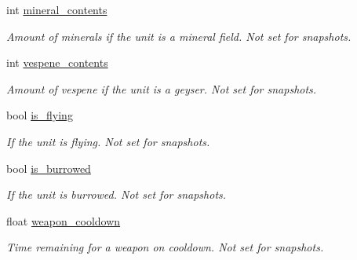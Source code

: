 \begin{DoxyCompactItemize}
\mbox{\label{classsc2_1_1_unit_a689d7b7c9a68b3cd172f2333203423b9}} 
int \hyperlink{classsc2_1_1_unit_a689d7b7c9a68b3cd172f2333203423b9}{mineral\+\_\+contents}
\begin{DoxyCompactList}\small\item\em Amount of minerals if the unit is a mineral field. Not set for snapshots. \end{DoxyCompactList}\item 
\mbox{\label{classsc2_1_1_unit_a76fcaa010a8a61b14b2839f49ef0f257}} 
int \hyperlink{classsc2_1_1_unit_a76fcaa010a8a61b14b2839f49ef0f257}{vespene\+\_\+contents}
\begin{DoxyCompactList}\small\item\em Amount of vespene if the unit is a geyser. Not set for snapshots. \end{DoxyCompactList}\item 
\mbox{\label{classsc2_1_1_unit_a6480f0b177f99a656ab3a273df3f8c3c}} 
bool \hyperlink{classsc2_1_1_unit_a6480f0b177f99a656ab3a273df3f8c3c}{is\+\_\+flying}
\begin{DoxyCompactList}\small\item\em If the unit is flying. Not set for snapshots. \end{DoxyCompactList}\item 
\mbox{\label{classsc2_1_1_unit_af815cd5269616209d4a2bdf2e734decb}} 
bool \hyperlink{classsc2_1_1_unit_af815cd5269616209d4a2bdf2e734decb}{is\+\_\+burrowed}
\begin{DoxyCompactList}\small\item\em If the unit is burrowed. Not set for snapshots. \end{DoxyCompactList}\item 
\mbox{\label{classsc2_1_1_unit_a09bcc532a373b225b4ddb16fa77e9c41}} 
float \hyperlink{classsc2_1_1_unit_a09bcc532a373b225b4ddb16fa77e9c41}{weapon\+\_\+cooldown}
\begin{DoxyCompactList}\small\item\em Time remaining for a weapon on cooldown. Not set for snapshots. \end{DoxyCompactList}\item 
\mbox{\label{classsc2_1_1_unit_a45b97cf510454a385c372e512b40c51a}} 

\end{DoxyCompactItemize}
